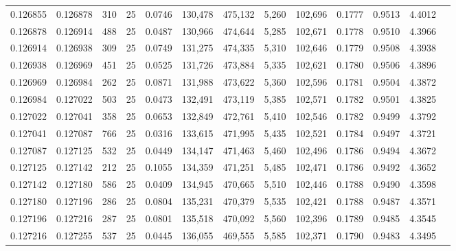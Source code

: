 \begin{tabular}{rrrrrrrrrrrrr}
0.126855 & 0.126878 &   310 &  25 &                                     0.0746 & 130,478 & 475,132 &   5,260 & 102,696 & 0.1777 & 0.9513 & 4.4012 \\
0.126878 & 0.126914 &   488 &  25 &                                     0.0487 & 130,966 & 474,644 &   5,285 & 102,671 & 0.1778 & 0.9510 & 4.3966 \\
0.126914 & 0.126938 &   309 &  25 &                                     0.0749 & 131,275 & 474,335 &   5,310 & 102,646 & 0.1779 & 0.9508 & 4.3938 \\
0.126938 & 0.126969 &   451 &  25 &                                     0.0525 & 131,726 & 473,884 &   5,335 & 102,621 & 0.1780 & 0.9506 & 4.3896 \\
0.126969 & 0.126984 &   262 &  25 &                                     0.0871 & 131,988 & 473,622 &   5,360 & 102,596 & 0.1781 & 0.9504 & 4.3872 \\
0.126984 & 0.127022 &   503 &  25 &                                     0.0473 & 132,491 & 473,119 &   5,385 & 102,571 & 0.1782 & 0.9501 & 4.3825 \\
0.127022 & 0.127041 &   358 &  25 &                                     0.0653 & 132,849 & 472,761 &   5,410 & 102,546 & 0.1782 & 0.9499 & 4.3792 \\
0.127041 & 0.127087 &   766 &  25 &                                     0.0316 & 133,615 & 471,995 &   5,435 & 102,521 & 0.1784 & 0.9497 & 4.3721 \\
0.127087 & 0.127125 &   532 &  25 &                                     0.0449 & 134,147 & 471,463 &   5,460 & 102,496 & 0.1786 & 0.9494 & 4.3672 \\
0.127125 & 0.127142 &   212 &  25 &                                     0.1055 & 134,359 & 471,251 &   5,485 & 102,471 & 0.1786 & 0.9492 & 4.3652 \\
0.127142 & 0.127180 &   586 &  25 &                                     0.0409 & 134,945 & 470,665 &   5,510 & 102,446 & 0.1788 & 0.9490 & 4.3598 \\
0.127180 & 0.127196 &   286 &  25 &                                     0.0804 & 135,231 & 470,379 &   5,535 & 102,421 & 0.1788 & 0.9487 & 4.3571 \\
0.127196 & 0.127216 &   287 &  25 &                                     0.0801 & 135,518 & 470,092 &   5,560 & 102,396 & 0.1789 & 0.9485 & 4.3545 \\
0.127216 & 0.127255 &   537 &  25 &                                     0.0445 & 136,055 & 469,555 &   5,585 & 102,371 & 0.1790 & 0.9483 & 4.3495 \\

\end{tabular}
